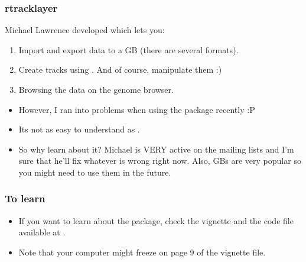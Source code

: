 \begin{frame}[allowframebreaks]
  \frametitle{rtracklayer}
  Michael Lawrence developed  which lets you:
  \begin{enumerate}
  \item Import and export data to a GB (there are several formats).
  \item Create tracks using . And of course, manipulate them :)
  \item Browsing the data on the genome browser.
  \end{enumerate}
  \begin{itemize}
  \item However, I ran into problems when using the package recently :P
  \item Its not as easy to understand as .
  \item So why learn about it? Michael is \alert{VERY} active on the mailing lists and I'm sure that he'll fix whatever is wrong right now. Also, GBs are very popular so you might need to use them in the future.
  \end{itemize}
\end{frame}

\begin{frame}[allowframebreaks]
  \frametitle{To learn}
  \begin{itemize}
  \item If you want to learn about the package, check the vignette and the  code file available at .
  \item Note that your computer might freeze on page 9 of the vignette file.
  \end{itemize}
\end{frame}


